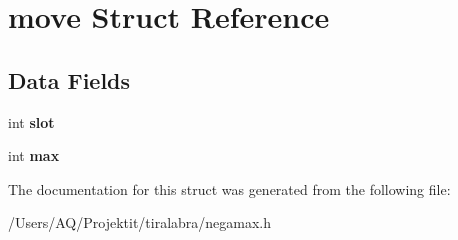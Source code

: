 \hypertarget{structmove}{
\section{move Struct Reference}
\label{structmove}
}
\subsection*{Data Fields}
\begin{DoxyCompactItemize}
\item 
\hypertarget{structmove_a83d6e2127b4cc5e01f2012608487d31a}{
int {\bfseries slot}}
\label{structmove_a83d6e2127b4cc5e01f2012608487d31a}

\item 
\hypertarget{structmove_ae1e1dde676c120fa6d10f3bb2c14059e}{
int {\bfseries max}}
\label{structmove_ae1e1dde676c120fa6d10f3bb2c14059e}

\end{DoxyCompactItemize}


The documentation for this struct was generated from the following file:\begin{DoxyCompactItemize}
\item 
/Users/AQ/Projektit/tiralabra/negamax.h\end{DoxyCompactItemize}
